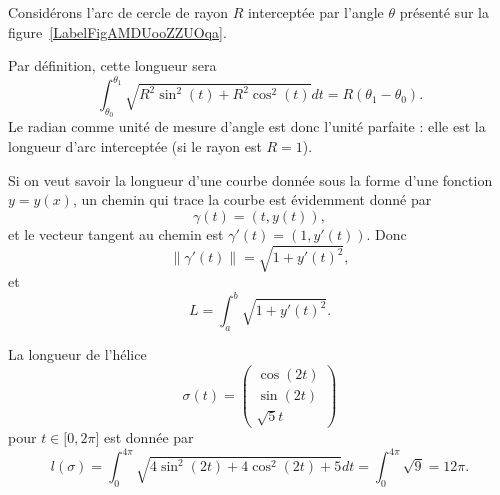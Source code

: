 \begin{example}
    Considérons l'arc de cercle de rayon $R$ interceptée par l'angle $\theta$ présenté sur la figure~\ref{LabelFigAMDUooZZUOqa}. %
\newcommand{\CaptionFigAMDUooZZUOqa}{Quelle est la longueur de la partie bleue de ce cercle de rayon $R$ ?}


    Par définition, cette longueur sera
    \begin{equation}
        \int_{\theta_0}^{\theta_1}\sqrt{R^2\sin^2(t)+R^2\cos^2(t)}dt=R(\theta_1-\theta_0).
    \end{equation}
    Le radian comme unité de mesure d'angle est donc l'unité parfaite : elle est la longueur d'arc interceptée (si le rayon est $R=1$).
\end{example}

\begin{normaltext}
    Si on veut savoir la longueur d'une courbe donnée sous la forme d'une fonction $y=y(x)$, un chemin qui trace la courbe est évidemment donné par
    \begin{equation}
        \gamma(t)=(t,y(t)),
    \end{equation}
    et le vecteur tangent au chemin est $\gamma'(t)=(1,y'(t))$. Donc
    \begin{equation}
        \| \gamma'(t) \|=\sqrt{1+y'(t)^2},
    \end{equation}
    et
    \begin{equation}			\label{EqLongFonction}
        L=\int_a^b\sqrt{1+y'(t)^2}.
    \end{equation}
\end{normaltext}

\begin{example}
    La longueur de l'hélice
    \begin{equation}
        \sigma(t)=\begin{pmatrix}
            \cos(2t)    \\
            \sin(2t)    \\
            \sqrt{5}t
        \end{pmatrix}
    \end{equation}
    pour $t\in\mathopen[ 0 , 2\pi \mathclose]$ est donnée par
    \begin{equation}
        l(\sigma)=\int_0^{4\pi}\sqrt{4\sin^2(2t)+4\cos^2(2t)+5}dt=\int_0^{4\pi}\sqrt{9}=12\pi.
    \end{equation}
\end{example}

